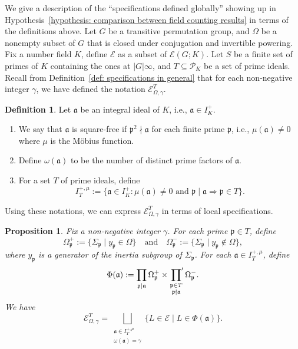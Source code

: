 \documentclass{amsart}
\numberwithin{equation}{section}
\theoremstyle{plain}
\newtheorem{proposition}[theorem]{Proposition}
\theoremstyle{definition}
\newtheorem{definition}[theorem]{Definition}
\theoremstyle{remark}
\begin{document}
We give a description of the ``specifications defined globally'' showing up in Hypothesis~\ref{hypothesis: comparison between field counting results} in terms of the definitions above.
Let $G$ be a transitive permutation group, and $\Omega$ be a nonempty subset of $G$ that is closed under conjugation and invertible powering.
Fix a number field $K$, define $\mathcal{E}$ as a subset of $\mathcal{E}(G;K)$.
Let $S$ be a finite set of primes of $K$ containing the ones at $\lvert G\rvert\infty$,
and $T\subseteq\mathcal{P}_K$ be a set of prime ideals.
Recall from Definition~\ref{def: specifications in general} that for each non-negative integer $\gamma$, we have defined the notation $\mathcal{E}_{\Omega,\gamma}^{T}$.
\begin{definition}\label{def: square-free ideals}
	Let $\mathfrak{a}$ be an integral ideal of $K$, i.e., $\mathfrak{a}\in I_K^+$.
	\begin{enumerate}
		\item We say that $\mathfrak{a}$ is square-free if $\mathfrak{p}^2\nmid\mathfrak{a}$ for each finite prime $\mathfrak{p}$, i.e., $\mu(\mathfrak{a})\neq0$ where $\mu$ is the M{\"o}bius function.
		\item Define $\omega(\mathfrak{a})$ to be the number of distinct prime factors of $\mathfrak{a}$.
		\item For a set $T$ of prime ideals, define
		\begin{equation*}
			I^{+,\mu}_T:=\{\mathfrak{a}\in I_K^+:\mu(\mathfrak{a})\neq0\text{ and }\mathfrak{p}\mid\mathfrak{a}\Rightarrow\mathfrak{p}\in T\}.
		\end{equation*}   
	\end{enumerate}
\end{definition}
Using these notations, we can express $\mathcal{E}_{\Omega,\gamma}^{T}$ in terms of local specifications.
\begin{proposition}\label{prop: translation between local and global specifications}
	Fix a non-negative integer $\gamma$.
	For each prime $\mathfrak{p}\in T$, define
	\begin{equation*}
		\Omega^{+}_{\mathfrak{p}}:=\{\Sigma_{\mathfrak{p}}\mid y_{\mathfrak{p}}\in\Omega\}
		\quad\text{and}\quad
		\Omega^{-}_{\mathfrak{p}}:=\{\Sigma_{\mathfrak{p}}\mid y_{\mathfrak{p}}\notin\Omega\},
	\end{equation*}
	where $y_{\mathfrak{p}}$ is a generator of the inertia subgroup of $\Sigma_{\mathfrak{p}}$.
	For each $\mathfrak{a}\in I^{+,\mu}_T$, define
	\begin{equation*}
		\Phi(\mathfrak{a}):=\prod_{\mathfrak{p}\mid\mathfrak{a}}\Omega^{+}_{\mathfrak{p}}\times\sideset{}{'}{\prod}_{
			\substack{
				\mathfrak{p}\in T\\
				\mathfrak{p}\nmid\mathfrak{a}
			}
		}\Omega^{-}_{\mathfrak{p}}.
	\end{equation*}
	We have
	\begin{equation}\label{eqn: translation between local and global specifications}
		\mathcal{E}_{\Omega,\gamma}^{T}=
		\bigsqcup_{
			\substack{
				\mathfrak{a}\in I^{+,\mu}_T\\
				\omega(\mathfrak{a})=\gamma
			}
		}\{L\in\mathcal{E}\mid L\in\Phi(\mathfrak{a})\}.
	\end{equation}	
\end{proposition}
\end{document}
